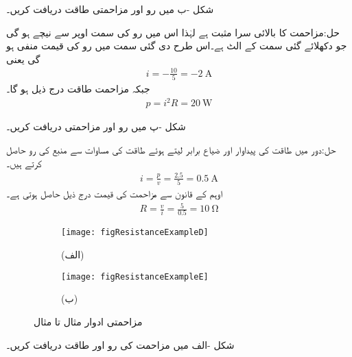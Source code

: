 شکل -ب میں رو اور مزاحمتی طاقت دریافت کریں۔

حل:مزاحمت کا بالائی سرا مثبت ہے لہٰذا اس میں رو کی سمت اوپر سے نیچے ہو گی جو دکھلائے گئی سمت کے الٹ ہے۔اس طرح دی گئی سمت میں رو کی قیمت منفی ہو گی یعنی
\begin{align*}
i=-\frac{10}{5}=\SI{-2}{\ampere}
\end{align*}
جبکہ مزاحمت طاقت درج ذیل ہو گا۔
\begin{align*}
p=i^2 R=\SI{20}{\watt}
\end{align*}

شکل -پ میں رو اور مزاحمتی دریافت کریں۔

حل:دور میں طاقت کی پیداوار اور ضیاع برابر لیتے ہوئے طاقت کی مساوات  سے منبع کی رو حاصل کرتے ہیں۔
\begin{align*}
i=\frac{p}{v}=\frac{2.5}{5}=\SI{0.5}{\ampere}
\end{align*}
اوہم کے قانون سے مزاحمت کی قیمت درج ذیل حاصل ہوتی ہے۔
\begin{align*}
R=\frac{v}{i}=\frac{5}{0.5}=\SI{10}{\ohm}
\end{align*} 
\FloatBarrier

\begin{figure}
\centering
\begin{subfigure}{0.5\textwidth}
\texttt{[image: figResistanceExampleD]}
\caption*{(الف)}
\end{subfigure}%
%
\begin{subfigure}{0.5\textwidth}
\texttt{[image: figResistanceExampleE]}
\caption*{(ب)}
\end{subfigure}%
\caption{مزاحمتی ادوار مثال  تا مثال }
\label{شکل_مزاحمتی_اکلوتا_مزاحمت_کئی_منبع_کی_طاقت}
\end{figure}

شکل -الف میں مزاحمت کی رو اور طاقت دریافت کریں۔

